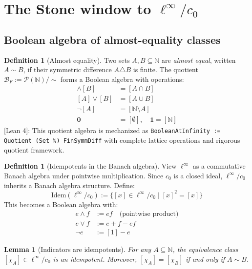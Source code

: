 \documentclass[11pt]{article}
\newtheorem{lemma}[theorem]{Lemma}
\theoremstyle{definition}
\newtheorem{definition}[theorem]{Definition}
\theoremstyle{remark}
\newcommand{\status}[1]{\textsf{\small\color{blue!60!black}[#1]}}
\newcommand{\N}{\mathbb{N}}
\newcommand{\cnull}{c_0}
\newcommand{\linf}{\ell^\infty}
\begin{document}
\section{The Stone window to \texorpdfstring{$\linf/\cnull$}{ℓ∞/c0}}\label{sec:stone}

\subsection{Boolean algebra of almost-equality classes}\label{ssec:BA}

\begin{definition}[Almost equality]
Two sets \(A, B \subseteq \N\) are \emph{almost equal}, written \(A \sim B\), if their symmetric difference \(A \triangle B\) is finite. The quotient \(\mathcal B_F := \mathcal P(\N)/{\sim}\) forms a Boolean algebra with operations:
\begin{align}
[A] \wedge [B] &= [A \cap B] \\
[A] \vee [B] &= [A \cup B] \\
\neg[A] &= [\N \setminus A] \\
\mathbf{0} &= [\emptyset], \quad \mathbf{1} = [\N]
\end{align}
\status{Lean 4}: This quotient algebra is mechanized as \texttt{BooleanAtInfinity := Quotient (Set ℕ) FinSymmDiff} with complete lattice operations and rigorous quotient framework.
\end{definition}

\begin{definition}[Idempotents in the Banach algebra]\label{def:idempotents}
View \(\linf\) as a commutative Banach algebra under pointwise multiplication. Since \(\cnull\) is a closed ideal, \(\linf/\cnull\) inherits a Banach algebra structure. Define:
\[
  \mathrm{Idem}(\linf/\cnull) := \{[x] \in \linf/\cnull \mid [x]^2 = [x]\}
\]
This becomes a Boolean algebra with:
\begin{align}
e \wedge f &:= ef \quad \text{(pointwise product)} \\
e \vee f &:= e + f - ef \\
\neg e &:= [1] - e
\end{align}
\end{definition}

\begin{lemma}[Indicators are idempotents]\label{lem:indicator-idem}
For any \(A \subseteq \N\), the equivalence class \([\chi_A] \in \linf/\cnull\) is an idempotent. Moreover, \([\chi_A] = [\chi_B]\) if and only if \(A \sim B\).
\end{lemma}
\end{document}
